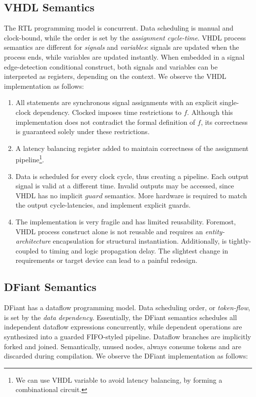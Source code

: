 \subsection{VHDL Semantics}
The RTL programming model is concurrent. Data scheduling is manual and clock-bound, while the order is set by the \textit{assignment cycle-time}. VHDL process semantics are different for \textit{signals} and \textit{variables}: signals are updated when the process ends, while variables are updated instantly. When embedded in a signal edge-detection conditional construct, both signals and variables can be interpreted as registers, depending on the context. We observe the VHDL  implementation as follows:

\begin{enumerate}[leftmargin=*]
  \item All statements are synchronous signal assignments with an explicit single-clock dependency. Clocked  imposes time restrictions to $f$. Although this implementation does not contradict the formal definition of $f$, its correctness is guaranteed solely under these restrictions.
  \item A latency balancing register added to maintain correctness of the  assignment pipeline\footnote{We can use VHDL variable to avoid latency balancing, by forming a combinational circuit.}. 
  \item Data is scheduled for every clock cycle, thus creating a pipeline. Each output signal is valid at a different time. Invalid outputs may be accessed, since VHDL has no implicit $guard$ semantics. More hardware is required to match the output cycle-latencies, and implement explicit guards.
  \item The implementation is very fragile and has limited reusability. Foremost, VHDL process construct alone is not reusable and requires an \textit{entity-architecture} encapsulation for structural instantiation. Additionally,  is tightly-coupled to  timing and logic propagation delay. The slightest change in requirements or target device can lead to a painful redesign. 
\end{enumerate}

\subsection{DFiant Semantics}
DFiant has a dataflow programming model. Data scheduling order, or \textit{token-flow}, is set by the \textit{data dependency}. Essentially, the DFiant semantics schedules all independent dataflow expressions concurrently, while dependent operations are synthesized into a guarded FIFO-styled pipeline. Dataflow branches are implicitly forked and joined. Semantically, unused nodes, always consume tokens and are discarded during compilation. We observe the DFiant  implementation as follows:

